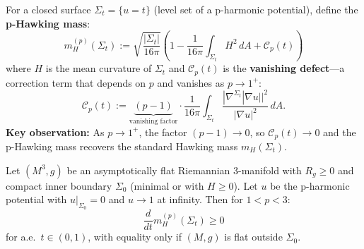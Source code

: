 \begin{definition}\label{def:p-hawking-mass}
For a closed surface $\Sigma_t = \{u = t\}$ (level set of a p-harmonic potential), define the \textbf{p-Hawking mass}:
\begin{equation}\label{eq:p-hawking-mass}
m_H^{(p)}(\Sigma_t) := \sqrt{\frac{|\Sigma_t|}{16\pi}} \left(1 - \frac{1}{16\pi} \int_{\Sigma_t} H^2 \, dA + \mathcal{C}_p(t) \right)
\end{equation}
where $H$ is the mean curvature of $\Sigma_t$ and $\mathcal{C}_p(t)$ is the \textbf{vanishing defect}---a correction term that depends on $p$ and vanishes as $p \to 1^+$:
\begin{equation}
\mathcal{C}_p(t) := \underbrace{(p-1)}_{\text{vanishing factor}} \cdot \frac{1}{16\pi} \int_{\Sigma_t} \frac{|\nabla^{\Sigma_t}|\nabla u||^2}{|\nabla u|^2} \, dA.
\end{equation}
\textbf{Key observation:} As $p \to 1^+$, the factor $(p-1) \to 0$, so $\mathcal{C}_p(t) \to 0$ and the p-Hawking mass recovers the standard Hawking mass $m_H(\Sigma_t)$.
\end{definition}

\begin{theorem}\label{thm:p-hawking-monotonicity}
Let $(M^3, g)$ be an asymptotically flat Riemannian 3-manifold with $R_g \geq 0$ and compact inner boundary $\Sigma_0$ (minimal or with $H \geq 0$). Let $u$ be the p-harmonic potential with $u|_{\Sigma_0} = 0$ and $u \to 1$ at infinity. Then for $1 < p < 3$:
\begin{equation}
\frac{d}{dt} m_H^{(p)}(\Sigma_t) \geq 0
\end{equation}
for a.e.\ $t \in (0, 1)$, with equality only if $(M, g)$ is flat outside $\Sigma_0$.
\end{theorem}

